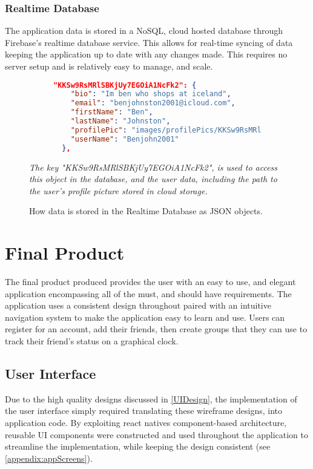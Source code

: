 \subsubsection{Realtime Database}
The application data is stored in a NoSQL, cloud hosted database through Firebase's realtime database service. This allows for real-time syncing of data keeping the application up to date with any changes made. This requires no server setup and is relatively easy to manage, and scale.
\begin{figure}[!htbp]
\centering
\begin{subfigure}[b]{0.85\textwidth}
\begin{lstlisting}[language=json]
"KKSw9RsMRlSBKjUy7EGOiA1NcFk2": {
    "bio": "Im ben who shops at iceland",
    "email": "benjohnston2001@icloud.com",
    "firstName": "Ben",
    "lastName": "Johnston",
    "profilePic": "images/profilePics/KKSw9RsMRlSBKjUy7EGOiA1NcFk2",
    "userName": "Benjohn2001"
  },
\end{lstlisting}
\end{subfigure}
\caption{How data is stored in the Realtime Database as JSON objects.}
\small\par\textit{{The key "KKSw9RsMRlSBKjUy7EGOiA1NcFk2", is used to access this object in the database, and the user data, including the path to the user's profile picture stored in cloud storage.}}
\label{jsonResp}
\end{figure}

\section{Final Product}
The final product produced provides the user with an easy to use, and elegant application encompassing all of the must, and should have requirements. The application uses a consistent design throughout paired with an intuitive navigation system to make the application easy to learn and use. Users can register for an account, add their friends, then create groups that they can use to track their friend's status on a graphical clock.
\subsection{User Interface}
Due to the high quality designs discussed in \ref{UIDesign}, the implementation of the user interface simply required translating these wireframe designs, into application code.
By exploiting react natives component-based architecture, reusable UI components were constructed and used throughout the application to streamline the implementation, while keeping the design consistent (see \ref{appendix:appScreens}).

